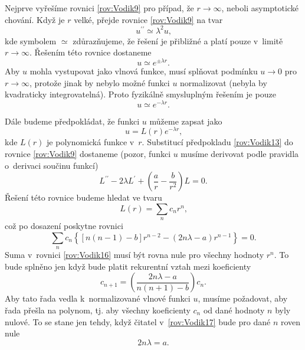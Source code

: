 Nejprve vyřešíme rovnici \eqref{rov:Vodik9} pro případ, že $r \rightarrow \infty$, neboli asymptotické chování. Když je $r$ velké, přejde rovnice \eqref{rov:Vodik9} na tvar
\begin{equation}
u^{\prime\prime} \simeq \lambda^2 u \mbox{,}
\label{rov:Vodik10}
\end{equation}
kde symbolem $\simeq$ zdůrazňujeme, že řešení je přibližné a platí pouze v~limitě $r \rightarrow \infty$. Řešením této rovnice dostaneme
\begin{equation}
u\simeq e^{\pm \lambda r} \mbox{.}
\label{rov:Vodik11}
\end{equation}
Aby $u$ mohla vystupovat jako vlnová funkce, musí splňovat podmínku $u \rightarrow 0$ pro $r \rightarrow \infty$, protože jinak by nebylo možné funkci $u$ normalizovat (nebyla by kvadraticky integrovatelná). Proto fyzikálně smysluplným řešením je pouze
\begin{equation}
u\simeq e^{- \lambda r} \mbox{.}
\label{rov:Vodik12}
\end{equation}

\noindent Dále budeme předpokládat, že funkci $u$ můžeme zapsat jako
\begin{equation}
u = L(r) e^{-\lambda r} \mbox{,}
\label{rov:Vodik13}
\end{equation}
kde $L(r)$ je polynomická funkce v~$r$. Substitucí předpokladu \eqref{rov:Vodik13} do rovnice \eqref{rov:Vodik9} dostaneme (pozor, funkci $u$ musíme derivovat podle pravidla o~derivaci součinu funkcí)
\begin{equation}
L^{\prime\prime} -2\lambda L^{\prime} + \left( \frac{a}{r} - \frac{b}{r^2} \right) L =0 \mbox{.}
\label{rov:Vodik14}
\end{equation}
Řešení této rovnice budeme hledat ve tvaru
\begin{equation}
L(r) = \sum_n c_n r^n \mbox{,}
\label{rov:Vodik15}
\end{equation}
což po dosazení poskytne rovnici
\begin{equation}
\sum_n c_n \left\lbrace [n(n-1) - b]r^{n-2} - (2n\lambda - a)r^{n-1} \right\rbrace = 0 \mbox{.}
\label{rov:Vodik16} 
\end{equation}
Suma v~rovnici \eqref{rov:Vodik16} musí být rovna nule pro všechny hodnoty $r^n$. To bude splněno jen když bude platit rekurentní vztah mezi koeficienty
\begin{equation}
c_{n+1} = \left(\frac{2n\lambda - a}{n(n+1) - b}\right) c_n \mbox{.}
\label{rov:Vodik17}
\end{equation}
Aby tato řada vedla k~normalizované vlnové funkci $u$, musíme požadovat, aby řada přešla na polynom, tj. aby všechny koeficienty $c_n$ od dané hodnoty $n$ byly nulové. To se stane jen tehdy, když čitatel v~\eqref{rov:Vodik17} bude pro dané $n$ roven nule
\begin{equation}
2n\lambda = a \mbox{.}
\label{rov:Vodik18}
\end{equation}

